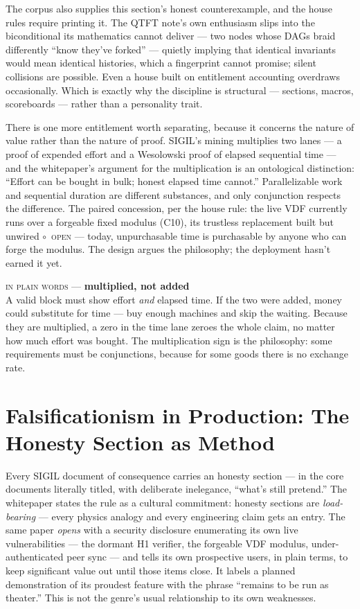 \documentclass[10pt,a4paper]{article}
\newcommand{\stO}{\textcolor{sigilamber}{$\circ$}~{\scriptsize\textcolor{sigilamber}{\textsc{open}}}}
\newcommand{\layman}[3]{%
\begin{tcolorbox}[enhanced,
  interior style={left color=#1!9,right color=white},
  colframe=#1!45!slate,boxrule=0.5pt,arc=3pt,
  borderline west={2.5pt}{0pt}{#1},
  left=9pt,right=9pt,top=7pt,bottom=7pt]
{\scriptsize\textcolor{#1}{\textsc{in plain words}}\; — \;\textbf{\small #2}}\\[3pt]
\small #3
\end{tcolorbox}}
\begin{document}
The corpus also supplies this section's honest counterexample, and the house rules
require printing it. The QTFT note's own enthusiasm slips into the biconditional
its mathematics cannot deliver — two nodes whose DAGs braid differently ``know
they've forked'' — quietly implying that identical invariants would mean identical
histories, which a fingerprint cannot promise; silent collisions are possible.
Even a house built on entitlement accounting overdraws occasionally. Which is
exactly why the discipline is structural — sections, macros, scoreboards — rather
than a personality trait.

There is one more entitlement worth separating, because it concerns the nature of
value rather than the nature of proof. SIGIL's mining multiplies two lanes — a
proof of expended effort and a Wesolowski proof of elapsed sequential time — and
the whitepaper's argument for the multiplication is an ontological distinction:
``Effort can be bought in bulk; honest elapsed time cannot.'' Parallelizable work
and sequential duration are different substances, and only conjunction respects
the difference. The paired concession, per the house rule: the live VDF currently runs
over a forgeable fixed modulus (C10), its trustless replacement built but unwired
\stO{} — today, unpurchasable time is purchasable by anyone who can forge the
modulus. The design argues the philosophy; the deployment hasn't earned it yet.

\layman{sigilcyan}{multiplied, not added}{A valid block must show effort
\emph{and} elapsed time. If the two were added, money could substitute for time —
buy enough machines and skip the waiting. Because they are multiplied, a zero in
the time lane zeroes the whole claim, no matter how much effort was bought. The
multiplication sign is the philosophy: some requirements must be conjunctions,
because for some goods there is no exchange rate.}

\section{Falsificationism in Production: The Honesty Section as Method}\label{sec:falsification}

Every SIGIL document of consequence carries an honesty section — in the core
documents literally titled, with deliberate inelegance, ``what's still pretend.'' The whitepaper states the rule as a cultural
commitment: honesty sections are \emph{load-bearing} — every physics analogy and
every engineering claim gets an entry. The same paper \emph{opens} with a security
disclosure enumerating its own live vulnerabilities — the dormant H1 verifier, the
forgeable VDF modulus, under-authenticated peer sync — and tells its own
prospective users, in plain terms, to keep significant value out until those items
close. It labels a planned demonstration of its proudest feature with the phrase
``remains to be run as theater.'' This is not the genre's usual relationship to
its own weaknesses.
\end{document}
